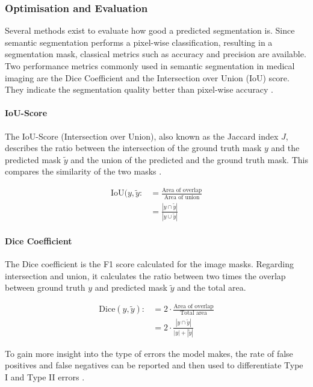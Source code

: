 \subsubsection{Optimisation and Evaluation}

Several methods exist to evaluate how good a predicted segmentation is. Since semantic segmentation performs a pixel-wise classification, resulting in a segmentation mask, classical metrics such as accuracy and precision are available. Two performance metrics commonly used in semantic segmentation in medical imaging are the Dice Coefficient and the Intersection over Union (IoU) score. They indicate the segmentation quality better than pixel-wise accuracy \cite{Eelbode}.

\paragraph{IoU-Score}

The IoU-Score (Intersection over Union), also known as the Jaccard index $J$, describes the ratio between the intersection of the ground truth mask $y$ and the predicted mask $\tilde{y}$ and the union of the predicted and the ground truth mask. This compares the similarity of the two masks \cite{Cho2021WeightedIO}.

\begin{align}
	\text{IoU}(y, \tilde{y} :&= \frac{\text{Area of overlap}}{\text{Area of union}}\\
	&=\frac{|y \cap \tilde{y}|}{|y \cup \tilde {y}|}
\end{align}


\paragraph{Dice Coefficient}

The Dice coefficient is the F1 score calculated for the image masks. Regarding intersection and union, it calculates the ratio between two times the overlap between ground truth $y$ and predicted mask $\tilde{y}$ and the total area.

\begin{align}
	\text{Dice}(y, \tilde{y}) :&= 2 \cdot \frac{\text{Area of overlap}}{\text{Total area}}\\
	&= 2 \cdot \frac{|y \cap \tilde{y}|}{|y| + |\tilde{y}|}
\end{align}

To gain more insight into the type of errors the model makes, the rate of false positives and false negatives can be reported and then used to differentiate Type I and Type II errors \cite{DFUC2022}.

